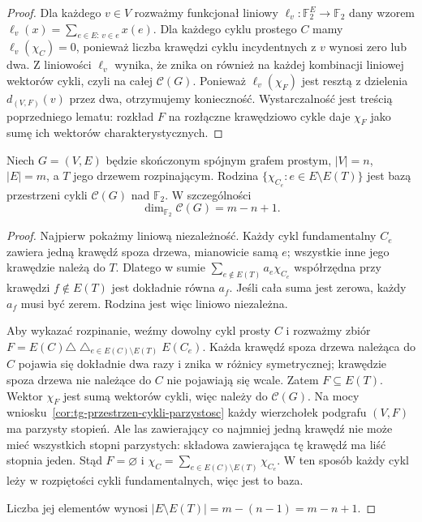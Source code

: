 \begin{proof}
Dla każdego $v\in V$ rozważmy funkcjonał liniowy
$\ell_v:\mathbb F_2^E\to\mathbb F_2$ dany wzorem
$\ell_v(x)=\sum_{e\in E:\,v\in e}x(e)$.
Dla każdego cyklu prostego $C$ mamy
$\ell_v(\chi_C)=0$, ponieważ liczba krawędzi
cyklu incydentnych z $v$ wynosi zero lub dwa.
Z liniowości $\ell_v$ wynika, że znika on również
na każdej kombinacji liniowej wektorów cykli,
czyli na całej $\mathcal C(G)$.
Ponieważ $\ell_v(\chi_F)$ jest resztą z dzielenia
$d_{(V,F)}(v)$ przez dwa, otrzymujemy konieczność.
Wystarczalność jest treścią poprzedniego lematu:
rozkład $F$ na rozłączne krawędziowo cykle daje
$\chi_F$ jako sumę ich wektorów charakterystycznych.
\end{proof}

\begin{twierdzenie}
\label{thm:tg-baza-cykli-fundamentalnych}
Niech $G=(V,E)$ będzie skończonym spójnym
grafem prostym, $|V|=n$, $|E|=m$,
a $T$ jego drzewem rozpinającym. Rodzina
$\{\chi_{C_e}:e\in E\setminus E(T)\}$
jest bazą przestrzeni cykli $\mathcal C(G)$
nad $\mathbb F_2$. W szczególności
\[
\dim_{\mathbb F_2}\mathcal C(G)=m-n+1.
\]
\end{twierdzenie}

\begin{proof}
Najpierw pokażmy liniową niezależność.
Każdy cykl fundamentalny $C_e$ zawiera
jedną krawędź spoza drzewa, mianowicie
samą $e$; wszystkie inne jego krawędzie
należą do $T$. Dlatego w sumie
$\sum_{e\notin E(T)}a_e\chi_{C_e}$
współrzędna przy krawędzi $f\notin E(T)$
jest dokładnie równa $a_f$. Jeśli cała
suma jest zerowa, każdy $a_f$ musi być
zerem. Rodzina jest więc liniowo niezależna.

Aby wykazać rozpinanie, weźmy dowolny
cykl prosty $C$ i rozważmy zbiór
$F=E(C)\triangle\bigtriangleup_{e\in E(C)\setminus E(T)} E(C_e)$.
Każda krawędź spoza drzewa należąca do $C$
pojawia się dokładnie dwa razy i znika w
różnicy symetrycznej; krawędzie spoza
drzewa nie należące do $C$ nie pojawiają się
wcale. Zatem $F\subseteq E(T)$.
Wektor $\chi_F$ jest sumą wektorów cykli,
więc należy do $\mathcal C(G)$. Na mocy
wniosku~\ref{cor:tg-przestrzen-cykli-parzystosc}
każdy wierzchołek podgrafu $(V,F)$ ma parzysty stopień.
Ale las zawierający co najmniej jedną krawędź
nie może mieć wszystkich stopni parzystych:
składowa zawierająca tę krawędź ma liść stopnia jeden.
Stąd $F=\varnothing$ i
$\chi_C=\sum_{e\in E(C)\setminus E(T)}\chi_{C_e}$.
W ten sposób każdy cykl leży w rozpiętości
cykli fundamentalnych, więc jest to baza.

Liczba jej elementów wynosi
$|E\setminus E(T)|=m-(n-1)=m-n+1$.
\end{proof}

